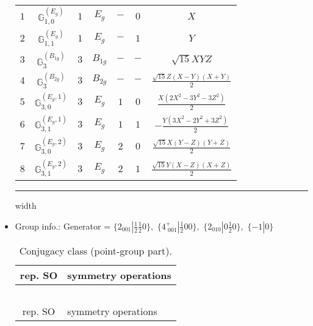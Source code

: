 \documentclass[fleqn,10pt,landscape]{article}
\begin{document}
\begin{itemize}
\begin{center}
\begin{longtable}{ccccccc}
$ 1 $ & $ \mathbb{G}_{1,0}^{(E_{g})} $ & $ 1 $ & $ E_{g} $ & $ - $ & $ 0 $ & $ X $ \\
$ 2 $ & $ \mathbb{G}_{1,1}^{(E_{g})} $ & $ 1 $ & $ E_{g} $ & $ - $ & $ 1 $ & $ Y $ \\ \hline
$ 3 $ & $ \mathbb{G}_{3}^{(B_{1g})} $ & $ 3 $ & $ B_{1g} $ & $ - $ & $ - $ & $ \sqrt{15} X Y Z $ \\
$ 4 $ & $ \mathbb{G}_{3}^{(B_{2g})} $ & $ 3 $ & $ B_{2g} $ & $ - $ & $ - $ & $ \frac{\sqrt{15} Z \left(X - Y\right) \left(X + Y\right)}{2} $ \\
$ 5 $ & $ \mathbb{G}_{3,0}^{(E_{g},1)} $ & $ 3 $ & $ E_{g} $ & $ 1 $ & $ 0 $ & $ \frac{X \left(2 X^{2} - 3 Y^{2} - 3 Z^{2}\right)}{2} $ \\
$ 6 $ & $ \mathbb{G}_{3,1}^{(E_{g},1)} $ & $ 3 $ & $ E_{g} $ & $ 1 $ & $ 1 $ & $ - \frac{Y \left(3 X^{2} - 2 Y^{2} + 3 Z^{2}\right)}{2} $ \\
$ 7 $ & $ \mathbb{G}_{3,0}^{(E_{g},2)} $ & $ 3 $ & $ E_{g} $ & $ 2 $ & $ 0 $ & $ \frac{\sqrt{15} X \left(Y - Z\right) \left(Y + Z\right)}{2} $ \\
$ 8 $ & $ \mathbb{G}_{3,1}^{(E_{g},2)} $ & $ 3 $ & $ E_{g} $ & $ 2 $ & $ 1 $ & $ \frac{\sqrt{15} Y \left(X - Z\right) \left(X + Z\right)}{2} $ \\
\end{longtable}
\end{center}

 \hfil \hrule height 1mm width \textwidth \hfil

\item Group info.: Generator = $\{2{}_{001}|\frac{1}{2} \frac{1}{2} 0\},\,\,\{4^{+}_{\,\,001}|\frac{1}{2} 0 0\},\,\,\{2{}_{010}|0 \frac{1}{2} 0\},\,\,\{-1|0\}$

\begin{center}
\renewcommand{\arraystretch}{1.3}
\begin{longtable}{c|l}
\caption{Conjugacy class (point-group part).}
 \\
 \hline \hline
rep. SO & symmetry operations \\ \hline \endfirsthead

\multicolumn{1}{l}{\tablename\ \thetable{}} \\
 \hline \hline
rep. SO & symmetry operations \\ \hline \endhead


\end{longtable}
\end{center}
\end{itemize}
\end{document}
